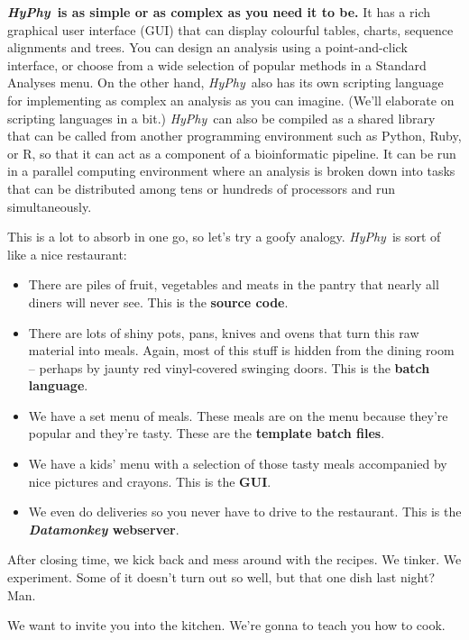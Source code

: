 \documentclass[12pt,twoside,openright]{book}
\newcommand{\hyphy}{\textit{HyPhy}}
\begin{document}
\textbf{\hyphy\ is as simple or as complex as you need it to be.}  It has a rich graphical user interface (GUI) that can display colourful tables, charts, sequence alignments and trees.  You can design an analysis using a point-and-click interface, or choose from a wide selection of popular methods in a Standard Analyses menu.  On the other hand, \hyphy\ also has its own scripting language for implementing as complex an analysis as you can imagine.  (We'll elaborate on scripting languages in a bit.)  \hyphy\ can also be compiled as a shared library that can be called from another programming environment such as Python, Ruby, or R, so that it can act as a component of a bioinformatic pipeline.  It can be run in a parallel computing environment where an analysis is broken down into tasks that can be distributed among tens or hundreds of processors and run simultaneously.  

This is a lot to absorb in one go, so let's try a goofy analogy.  \hyphy\ is sort of like a nice restaurant:
\begin{itemize}
\itemsep 0pt
\item There are piles of fruit, vegetables and meats in the pantry that nearly all diners will never see.  This is the {\bf source code}.  
\item There are lots of shiny pots, pans, knives and ovens that turn this raw material into meals.  Again, most of this stuff is hidden from the dining room -- perhaps by jaunty red vinyl-covered swinging doors.  This is the {\bf batch language}.
\item We have a set menu of meals.  These meals are on the menu because they're popular and they're tasty.  These are the {\bf template batch files}.  
\item We have a kids' menu with a selection of those tasty meals accompanied by nice pictures and crayons.  This is the {\bf GUI}.
\item We even do deliveries so you never have to drive to the restaurant.  This is the \textbf{\textit{Datamonkey} webserver}.
\end{itemize}

\noindent After closing time, we kick back and mess around with the recipes.  We tinker.  We experiment.  Some of it doesn't turn out so well, but that one dish last night?  Man.  

\vspace{1em}
We want to invite you into the kitchen.  We're gonna to teach you how to cook.


\end{document}

